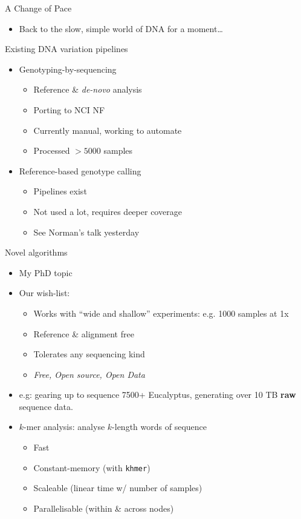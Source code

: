 \documentclass[t]{beamer}
\begin{document}
\begin{frame}[c]{A Change of Pace}
  \begin{itemize}
    \item Back to the slow, simple world of DNA for a moment\ldots
  \end{itemize}
\end{frame}

\begin{frame}{Existing DNA variation pipelines}
  \begin{itemize}
    \item Genotyping-by-sequencing
      \begin{itemize}
        \item Reference \& \textit{de-novo} analysis
        \item Porting to NCI NF
        \item Currently manual, working to automate
        \item Processed $>5000$ samples
      \end{itemize}
    \item Reference-based genotype calling
      \begin{itemize}
        \item Pipelines exist
        \item Not used a lot, requires deeper coverage
        \item See Norman's talk yesterday
      \end{itemize}
  \end{itemize}
\end{frame}

\begin{frame}{Novel algorithms}
  \begin{itemize}
    \item My PhD topic
  \pause
    \item Our wish-list:
    \begin{itemize}
      \item Works with ``wide and shallow'' experiments: e.g. 1000 samples at
            1x
      \item Reference \& alignment free
      \item Tolerates any sequencing kind
      \item \textit{Free, Open source, Open Data}
    \end{itemize}
  \pause
    \item e.g: gearing up to sequence 7500+ Eucalyptus, generating over 10 TB
      \textbf{raw} sequence data.
  \pause
    \item $k$-mer analysis: analyse $k$-length words of sequence
    \begin{itemize}
      \item Fast
      \item Constant-memory (with \texttt{khmer})
      \item Scaleable (linear time w/ number of samples)
      \item Parallelisable (within \& across nodes)
    \end{itemize}
  \end{itemize}
\end{frame}
\end{document}
